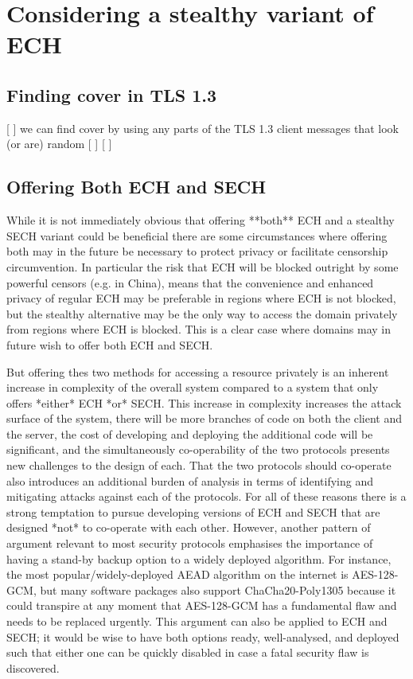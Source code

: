 \section{Considering a stealthy variant of ECH}
\subsection{Finding cover in TLS 1.3}
[ ] we can find cover by using any parts of the TLS 1.3 client messages that look (or are) random
[ ] 
[ ] 
\subsection{Offering Both ECH and SECH}
While it is not immediately obvious that offering **both** ECH and a stealthy SECH variant could be beneficial there are some circumstances where offering both may in the future be necessary to protect privacy or facilitate censorship circumvention. In particular the risk that ECH will be blocked outright by some powerful censors (e.g. in China), means that the convenience and enhanced privacy of regular ECH may be preferable in regions where ECH is not blocked, but the stealthy alternative may be the only way to access the domain privately from regions where ECH is blocked. This is a clear case where domains may in future wish to offer both ECH and SECH.

But offering thes two methods for accessing a resource privately is an inherent increase in complexity of the overall system compared to a system that only offers *either* ECH *or* SECH. This increase in complexity increases the attack surface of the system, there will be more branches of code on both the client and the server, the cost of developing and deploying the additional code will be significant, and the simultaneously co-operability of the two protocols presents new challenges to the design of each. That the two protocols should co-operate also introduces an additional burden of analysis in terms of identifying and mitigating attacks against each of the protocols. For all of these reasons there is a strong temptation to pursue developing versions of ECH and SECH that are designed *not* to co-operate with each other. However, another pattern of argument relevant to most security protocols emphasises the importance of having a stand-by backup option to a widely deployed algorithm. For instance, the most popular/widely-deployed AEAD algorithm on the internet is AES-128-GCM, but many software packages also support ChaCha20-Poly1305 because it could transpire at any moment that AES-128-GCM has a fundamental flaw and needs to be replaced urgently. This argument can also be applied to ECH and SECH; it would be wise to have both options ready, well-analysed, and deployed such that either one can be quickly disabled in case a fatal security flaw is discovered.

